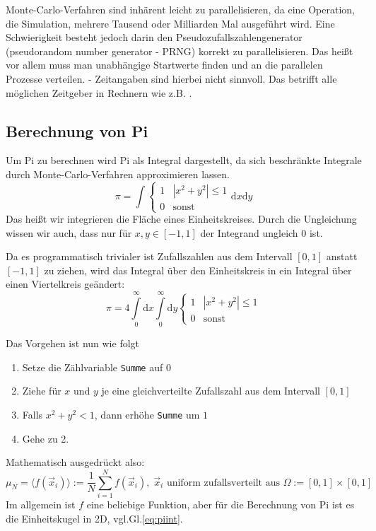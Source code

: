 Monte-Carlo-Verfahren sind inhärent leicht zu parallelisieren, da eine Operation, die Simulation, mehrere Tausend oder Milliarden Mal ausgeführt wird. Eine Schwierigkeit besteht jedoch darin den Pseudozufallszahlengenerator (pseudorandom number generator - PRNG) korrekt zu parallelisieren. Das heißt vor allem muss man unabhängige Startwerte finden und an die parallelen Prozesse verteilen.
 - Zeitangaben sind hierbei nicht sinnvoll. Das betrifft alle möglichen Zeitgeber in Rechnern wie z.B. .

\subsection{Berechnung von Pi}

Um Pi zu berechnen wird Pi als Integral dargestellt, da sich beschränkte Integrale durch Monte-Carlo-Verfahren approximieren lassen.
\begin{equation}
	\pi = \int \begin{cases}
					1 & |x^2+y^2| \leq 1\\
					0 & \text{sonst}
			   \end{cases}
		  \mathrm{d}x \mathrm{d}y
\end{equation}
Das heißt wir integrieren die Fläche eines Einheitskreises. Durch die Ungleichung wissen wir auch, dass nur für $x,y\in [-1,1]$ der Integrand ungleich $0$ ist.

Da es programmatisch trivialer ist Zufallszahlen aus dem Intervall $[0,1]$ anstatt $[-1,1]$ zu ziehen, wird das Integral über den Einheitskreis in ein Integral über einen Viertelkreis geändert:
\begin{equation}
	\label{eq:piint}
	\pi = 4 \int\limits_{0}^\infty \mathrm{d}x
		    \int\limits_{0}^\infty \mathrm{d}y
		    \begin{cases}1 & |x^2+y^2| \leq 1\\0 & \text{sonst} \end{cases}
\end{equation}

Das Vorgehen ist nun wie folgt
\begin{enumerate}
	\item Setze die Zählvariable \texttt{Summe} auf $0$
	\item Ziehe für $x$ und $y$ je eine gleichverteilte Zufallszahl aus dem Intervall $[0,1]$\
	\item Falls $x^2+y^2<1$, dann erhöhe \texttt{Summe} um $1$
	\item Gehe zu 2.
\end{enumerate}
Mathematisch ausgedrückt also:
\begin{equation}
	\label{eq:pimonteint}
	\mu_N = \langle f\left( \vec{x}_i \right) \rangle := \frac{1}{N} \sum_{i=1}^N f\left( \vec{x}_i \right),\;\vec{x}_i \text{ uniform zufallsverteilt aus } \Omega:=[0,1]\times[0,1]
\end{equation}
Im allgemein ist $f$ eine beliebige Funktion, aber für die Berechnung von Pi ist es die Einheitskugel in 2D, vgl.Gl.\ref{eq:piint}.

